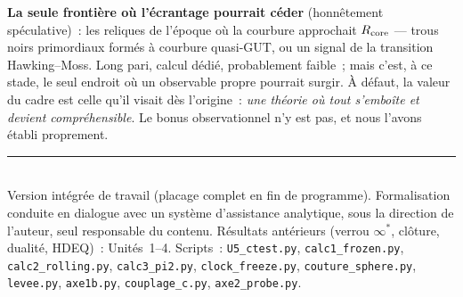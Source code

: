 \documentclass[11pt]{article}
\theoremstyle{definition}
\begin{document}
\textbf{La seule fronti\`ere o\`u l'\'ecrantage pourrait c\'eder} (honn\^etement sp\'eculative)~: les
reliques de l'\'epoque o\`u la courbure approchait $R_{\rm core}$ --- trous noirs primordiaux form\'es \`a
courbure quasi-GUT, ou un signal de la transition Hawking--Moss. Long pari, calcul d\'edi\'e, probablement
faible~; mais c'est, \`a ce stade, le seul endroit o\`u un observable propre pourrait surgir. \`A d\'efaut,
la valeur du cadre est celle qu'il visait d\`es l'origine~: \emph{une th\'eorie o\`u tout s'emboîte et
devient compr\'ehensible}. Le bonus observationnel n'y est pas, et nous l'avons \'etabli proprement.


\bigskip
\noindent\rule{\textwidth}{0.3pt}\\
{\footnotesize Version int\'egr\'ee de travail (placage complet en fin de programme). Formalisation
conduite en dialogue avec un syst\`eme d'assistance analytique, sous la direction de l'auteur, seul
responsable du contenu. R\'esultats ant\'erieurs (verrou $\infty^\ast$, cl\^oture, dualit\'e, HDEQ)~:
Unit\'es~1--4. Scripts~: \texttt{U5\_ctest.py}, \texttt{calc1\_frozen.py}, \texttt{calc2\_rolling.py},
\texttt{calc3\_pi2.py}, \texttt{clock\_freeze.py}, \texttt{couture\_sphere.py}, \texttt{levee.py},
\texttt{axe1b.py}, \texttt{couplage\_c.py}, \texttt{axe2\_probe.py}.}
\end{document}
